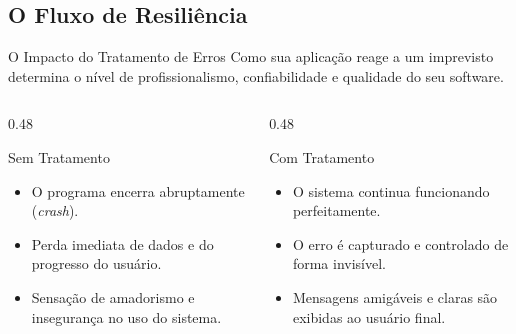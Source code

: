 \documentclass[9pt]{beamer}
\begin{document}
\subsection{O Fluxo de Resiliência}
\begin{frame}{O Impacto do Tratamento de Erros}
    Como sua aplicação reage a um imprevisto determina o nível de profissionalismo, confiabilidade e qualidade do seu software.
    
    \vspace{0.2cm}
    
    \begin{columns}[t]
        \begin{column}{0.48\textwidth}
            \begin{block}{Sem Tratamento}
                \small
                \begin{itemize}
                    \item O programa encerra abruptamente (\textit{crash}).
                    \item Perda imediata de dados e do progresso do usuário.
                    \item Sensação de amadorismo e insegurança no uso do sistema.
                \end{itemize}
            \end{block}
        \end{column}
        
        \begin{column}{0.48\textwidth}
            \begin{block}{Com Tratamento}
                \small
                \begin{itemize}
                    \item O sistema continua funcionando perfeitamente.
                    \item O erro é capturado e controlado de forma invisível.
                    \item Mensagens amigáveis e claras são exibidas ao usuário final.
                \end{itemize}
            \end{block}
        \end{column}
    \end{columns}
    
    \vspace{0.3cm}
    
    \begin{center}
\end{center}
\end{frame}
\end{document}
